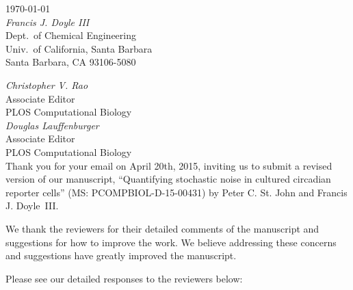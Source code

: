 \documentclass[11pt, letterpaper]{article}
\begin{document}
\begin{flushright}
\today\\[2ex]
{\itshape Francis J. Doyle III}\\
Dept.\ of Chemical Engineering\\
Univ.\ of California, Santa Barbara\\
Santa Barbara, CA 93106-5080\\
\end{flushright}

{\itshape Christopher V. Rao}\\
Associate Editor\\
PLOS Computational Biology\\

{\itshape Douglas Lauffenburger}\\
Associate Editor\\
PLOS Computational Biology\\

Thank you for your email on April 20th, 2015, inviting us to submit a revised version of our manuscript, ``Quantifying stochastic noise in cultured circadian reporter cells'' (MS: PCOMPBIOL-D-15-00431) by Peter C. St. John and Francis J. Doyle~III.

We thank the reviewers for their detailed comments of the manuscript and suggestions for how to improve the work.
We believe addressing these concerns and suggestions have greatly improved the manuscript.

Please see our detailed responses to the reviewers below: 
\end{document}

